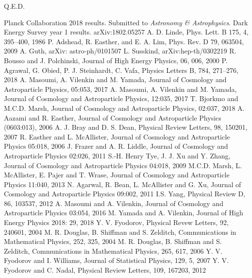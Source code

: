 \documentclass[12pt]{article}
\begin{document}
Q.E.D.

\begin{thebibliography}{99}
 Planck Collaboration 2018 results. Submitted to \emph{Astronomy \& Astrophysics}.
 Dark Energy Survey year 1 results. arXiv:1802.05257
 A. D. Linde, Phys. Lett. B 175, 4, 395--400, 1986
 P. Adshead, R. Easther, and E. A. Lim, Phys. Rev. D 79, 063504, 2009
 A. Guth, arXiv: astro-ph/0101507
 L. Susskind, arXiv:hep-th/0302219
 R. Bousso and J. Polchinski, Journal of High Energy Physics, 06, 006, 2000
 P. Agrawal, G. Obied, P. J. Steinhardt, C. Vafa, Physics Letters B, 784, 271--276, 2018
 A. Masoumi, A. Vilenkin and M. Yamada, Journal of Cosmology and Astroparticle Physics, 05:053, 2017
 A. Masoumi, A. Vilenkin and M. Yamada, Journal of Cosmology and Astroparticle Physics, 12:035, 2017
 T. Bjorkmo and M.C.D. Marsh, Journal of Cosmology and Astroparticle Physics, 02:037, 2018
 A. Aazami and R. Easther, Journal of Cosmology and Astroparticle Physics (0603:013), 2006
 A. J. Bray and D. S. Dean, Physical Review Letters, 98, 150201, 2007
 R. Easther and L. McAllister, Journal of Cosmology and Astroparticle Physics 05:018, 2006
 J. Frazer and A. R. Liddle, Journal of Cosmology and Astroparticle Physics 02:026, 2011
 S.-H. Henry Tye, J. J. Xu and Y. Zhang, Journal of Cosmology and Astroparticle Physics 04:018, 2009
 M.C.D. Marsh, L. McAllister, E. Pajer and T. Wrase, Journal of Cosmology and Astroparticle Physics 11:040, 2013
 N. Agarwal, R. Bean, L. McAllister and G. Xu, Journal of Cosmology and Astroparticle Physics 09:002, 2011
 I.S. Yang, Physical Review D, 86, 103537, 2012
 A. Masoumi and A. Vilenkin, Journal of Cosmology and Astroparticle Physics 03:054, 2016
 M. Yamada and A. Vilenkin, Journal of High Energy Physics 2018: 29, 2018
 Y. V. Fyodorov, Physical Revew Letters, 92, 240601, 2004
 M. R. Douglas, B. Shiffman and S. Zelditch, Communications in Mathematical Physics, 252, 325, 2004
 M. R. Douglas, B. Shiffman and S. Zelditch, Communications in Mathematical Physics, 265, 617, 2006 
 Y. V. Fyodorov and I. Williams, Journal of Statistical Physics, 129, 5, 2007
 Y. V. Fyodorov and C. Nadal, Physical Review Letters, 109, 167203, 2012

\end{thebibliography}
\end{document}

